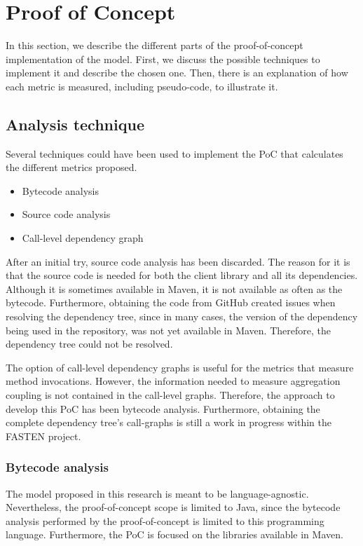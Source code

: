 \chapter{Proof of Concept}\label{ch:PoC}
In this section, we describe the different parts of the proof-of-concept implementation of the model. First, we discuss the possible techniques to implement it and describe the chosen one. Then, there is an explanation of how each metric is measured, including pseudo-code, to illustrate it.

\section{Analysis technique}
Several techniques could have been used to implement the PoC that calculates the different metrics proposed.

\begin{itemize}
  \item Bytecode analysis
  \item Source code analysis
  \item Call-level dependency graph
\end{itemize}

After an initial try, source code analysis has been discarded. The reason for it is that the source code is needed for both the client library and all its dependencies. Although it is sometimes available in Maven, it is not available as often as the bytecode. Furthermore, obtaining the code from GitHub created issues when resolving the dependency tree, since in many cases, the version of the dependency being used in the repository, was not yet available in Maven. Therefore, the dependency tree could not be resolved.

The option of call-level dependency graphs is useful for the metrics that measure method invocations. However, the information needed to measure aggregation coupling is not contained in the call-level graphs. Therefore, the approach to develop this PoC has been bytecode analysis. Furthermore, obtaining the complete dependency tree's call-graphs is still a work in progress within the FASTEN project.

\subsection{Bytecode analysis}
The model proposed in this research is meant to be language-agnostic. Nevertheless, the proof-of-concept scope is limited to Java, since the bytecode analysis performed by the proof-of-concept is limited to this programming language. Furthermore, the PoC is focused on the libraries available in Maven.

